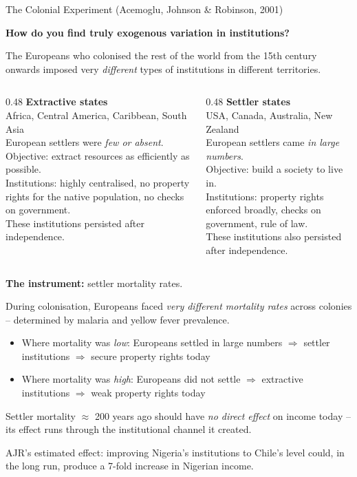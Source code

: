 \documentclass[10pt]{beamer}
\begin{document}
\begin{frame}[allowframebreaks]{The Colonial Experiment (Acemoglu, Johnson \& Robinson, 2001)}

\textbf{How do you find truly exogenous variation in institutions?}


The Europeans who colonised the rest of the world from the 15th century onwards imposed very \emph{different} types of institutions in different territories.


\begin{columns}[T]
\begin{column}{0.48\textwidth}
\textbf{\color{myTeal} Extractive states}\\[6pt]
Africa, Central America, Caribbean, South Asia\\[4pt]
\footnotesize
European settlers were \emph{few or absent}.\\
Objective: extract resources as efficiently as possible.\\
Institutions: highly centralised, no property rights for the native population, no checks on government.\\[4pt]
\alert{These institutions persisted after independence.}
\end{column}
\begin{column}{0.48\textwidth}
\textbf{\color{myOrange} Settler states}\\[6pt]
USA, Canada, Australia, New Zealand\\[4pt]
\footnotesize
European settlers came \emph{in large numbers}.\\
Objective: build a society to live in.\\
Institutions: property rights enforced broadly, checks on government, rule of law.\\[4pt]
\alert{These institutions also persisted after independence.}
\end{column}
\end{columns}


\textbf{The instrument:} settler mortality rates.

During colonisation, Europeans faced \emph{very different mortality rates} across colonies -- determined by malaria and yellow fever prevalence.

\begin{itemize}
\item Where mortality was \emph{low}: Europeans settled in large numbers $\Rightarrow$ settler institutions $\Rightarrow$ secure property rights today
\item Where mortality was \emph{high}: Europeans did not settle $\Rightarrow$ extractive institutions $\Rightarrow$ weak property rights today
\end{itemize}


Settler mortality $\approx$ 200 years ago should have \emph{no direct effect} on income today -- its effect runs through the institutional channel it created.


\alert{AJR's estimated effect: improving Nigeria's institutions to Chile's level could, in the long run, produce a 7-fold increase in Nigerian income.}
\end{frame}
\end{document}
